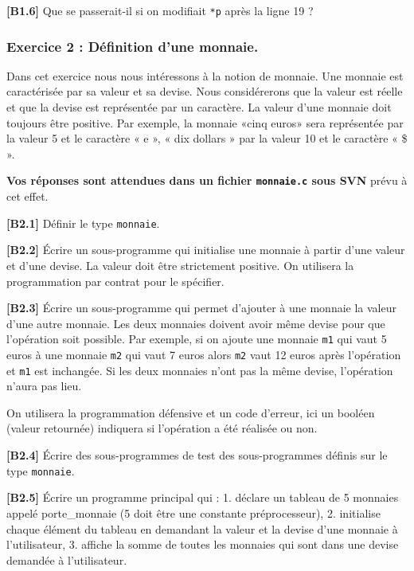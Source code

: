 \documentclass[11pt]{article}
\begin{document}
\textbf{{[}B1.6{]}} Que se passerait-il si on modifiait \texttt{*p}
après la ligne 19 ?

    \hypertarget{exercice-2-duxe9finition-dune-monnaie.}{%
\subsubsection{Exercice 2 : Définition d'une
monnaie.}\label{exercice-2-duxe9finition-dune-monnaie.}}

Dans cet exercice nous nous intéressons à la notion de monnaie. Une
monnaie est caractérisée par sa valeur et sa devise. Nous considérerons
que la valeur est réelle et que la devise est représentée par un
caractère. La valeur d'une monnaie doit toujours être positive. Par
exemple, la monnaie «cinq euros» sera représentée par la valeur 5 et le
caractère « e », « dix dollars » par la valeur 10 et le caractère « \$
».

\textbf{Vos réponses sont attendues dans un fichier \texttt{monnaie.c}
sous SVN} prévu à cet effet.

    \textbf{{[}B2.1{]}} Définir le type \texttt{monnaie}.

\textbf{{[}B2.2{]}} Écrire un sous-programme qui initialise une monnaie
à partir d'une valeur et d'une devise. La valeur doit être strictement
positive. On utilisera la programmation par contrat pour le spécifier.

\textbf{{[}B2.3{]}} Écrire un sous-programme qui permet d'ajouter à une
monnaie la valeur d'une autre monnaie. Les deux monnaies doivent avoir
même devise pour que l'opération soit possible. Par exemple, si on
ajoute une monnaie \texttt{m1} qui vaut 5 euros à une monnaie
\texttt{m2} qui vaut 7 euros alors \texttt{m2} vaut 12 euros après
l'opération et \texttt{m1} est inchangée. Si les deux monnaies n'ont pas
la même devise, l'opération n'aura pas lieu.

On utilisera la programmation défensive et un code d'erreur, ici un
booléen (valeur retournée) indiquera si l'opération a été réalisée ou
non.

\textbf{{[}B2.4{]}} Écrire des sous-programmes de test des
sous-programmes définis sur le type \texttt{monnaie}.

\textbf{{[}B2.5{]}} Écrire un programme principal qui : 1. déclare un
tableau de 5 monnaies appelé porte\_monnaie (5 doit être une constante
préprocesseur), 2. initialise chaque élément du tableau en demandant la
valeur et la devise d'une monnaie à l'utilisateur, 3. affiche la somme
de toutes les monnaies qui sont dans une devise demandée à
l'utilisateur.
\end{document}
